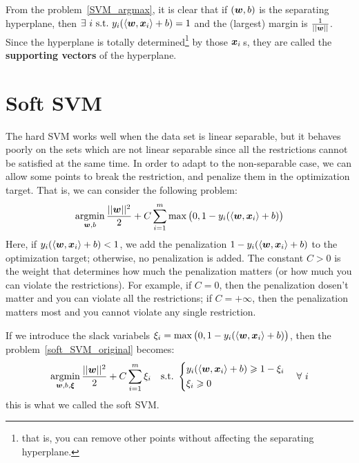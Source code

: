 \begin{re}
    From the problem~\eqref{SVM_argmax}, it is clear that if $(\boldsymbol{w}, b)$ is the separating hyperplane, then
    $\exists~i\ \text{s.t.\ } y_i(\langle\boldsymbol{w}, \boldsymbol{x}_i\rangle + b) = 1$ and the (largest) margin is $\frac{1}{||\boldsymbol{w}||}$.
    Since the hyperplane is totally determined\footnote{that is, you can remove other points without affecting
    the separating hyperplane.} by those $\boldsymbol{x}_i$\,s, they are called the \textbf{supporting vectors} of the
    hyperplane.
\end{re}

\section{Soft SVM}
The hard SVM works well when the data set is linear separable, but it behaves poorly on the sets which are not
linear separable since all the restrictions cannot be satisfied at the same time. In order to adapt to the 
non-separable case, we can allow some points to break the restriction, and penalize them in the optimization
target. That is, we can consider the following problem:
\begin{equation}\label{soft_SVM_original}
    \operatorname*{argmin}_{\boldsymbol{w}, b} \frac{||\boldsymbol{w}||^2}{2} + C\sum_{i=1}^{m}\max\big(0, 1 - y_i(\langle\boldsymbol{w}, \boldsymbol{x}_i\rangle
    + b)\big)
\end{equation}
Here, if $y_i(\langle\boldsymbol{w}, \boldsymbol{x}_i\rangle + b) < 1$, we add the penalization 
$1 - y_i(\langle\boldsymbol{w}, \boldsymbol{x}_i\rangle +b)$ to the 
optimization target; otherwise, no penalization is added. The constant $C > 0$ is the weight that determines 
how much the penalization matters (or how much you can violate the restrictions). For example, if $C = 0$, 
then the penalization dosen't matter and you can violate all the restrictions; if $C = +\infty$, then the 
penalization matters most and you cannot violate any single restriction.\par
If we introduce the slack variabels $\xi_i = \max\big(0, 1 - y_i(\langle\boldsymbol{w}, \boldsymbol{x}_i\rangle +b)\big)$, then
the problem~\eqref{soft_SVM_original} becomes:
\begin{equation}\label{soft_SVM}
    \operatorname*{argmin}_{\boldsymbol{w}, b, \boldsymbol{\xi}} \frac{||\boldsymbol{w}||^2}{2} + C\sum_{i=1}^{m}\xi_i\quad\text{s.t.\ }\left\{
    \begin{aligned}
    & y_i(\langle\boldsymbol{w}, \boldsymbol{x}_i\rangle + b) \geqslant 1 - \xi_i\\
    & \xi_i \geqslant 0 
    \end{aligned}\right.
    \quad\forall~i
\end{equation}
this is what we called the soft SVM\@.

